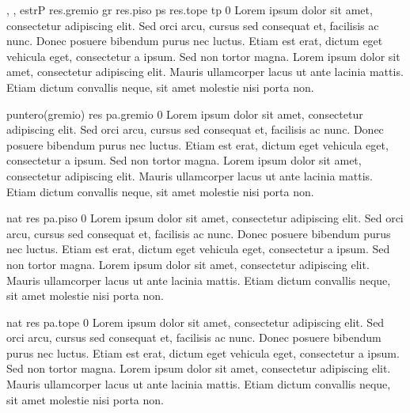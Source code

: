{, , }{estrP}
{
	\state res.gremio \asig gr										
	\state res.piso \asig ps										
	\state res.tope \asig tp										
}
{0}
{Lorem ipsum dolor sit amet, consectetur adipiscing elit. Sed orci arcu, cursus sed consequat et, facilisis ac nunc. Donec posuere bibendum purus nec luctus. Etiam est erat, dictum eget vehicula eget, consectetur a ipsum. Sed non tortor magna. Lorem ipsum dolor sit amet, consectetur adipiscing elit. Mauris ullamcorper lacus ut ante lacinia mattis. Etiam dictum convallis neque, sit amet molestie nisi porta non.}

{}{puntero(gremio)}
{
	\state res \asig pa.gremio										
}
{0}
{Lorem ipsum dolor sit amet, consectetur adipiscing elit. Sed orci arcu, cursus sed consequat et, facilisis ac nunc. Donec posuere bibendum purus nec luctus. Etiam est erat, dictum eget vehicula eget, consectetur a ipsum. Sed non tortor magna. Lorem ipsum dolor sit amet, consectetur adipiscing elit. Mauris ullamcorper lacus ut ante lacinia mattis. Etiam dictum convallis neque, sit amet molestie nisi porta non.}

{}{nat}
{
	\state res \asig pa.piso										
}
{0}
{Lorem ipsum dolor sit amet, consectetur adipiscing elit. Sed orci arcu, cursus sed consequat et, facilisis ac nunc. Donec posuere bibendum purus nec luctus. Etiam est erat, dictum eget vehicula eget, consectetur a ipsum. Sed non tortor magna. Lorem ipsum dolor sit amet, consectetur adipiscing elit. Mauris ullamcorper lacus ut ante lacinia mattis. Etiam dictum convallis neque, sit amet molestie nisi porta non.}

{}{nat}
{
	\state res \asig pa.tope										
}
{0}
{Lorem ipsum dolor sit amet, consectetur adipiscing elit. Sed orci arcu, cursus sed consequat et, facilisis ac nunc. Donec posuere bibendum purus nec luctus. Etiam est erat, dictum eget vehicula eget, consectetur a ipsum. Sed non tortor magna. Lorem ipsum dolor sit amet, consectetur adipiscing elit. Mauris ullamcorper lacus ut ante lacinia mattis. Etiam dictum convallis neque, sit amet molestie nisi porta non.}